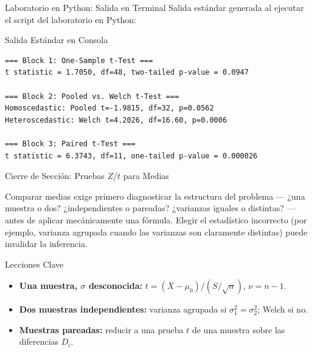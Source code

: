 \documentclass[10pt, aspectratio=169]{beamer}
\begin{document}
\begin{frame}[fragile]{Laboratorio en Python: Salida en Terminal}
  \scriptsize
  Salida estándar generada al ejecutar el script del laboratorio en Python:
  \vspace{0.02cm}
  \begin{block}{Salida Estándar en Consola}
    \fontsize{4pt}{5pt}\selectfont
    \begin{verbatim}
=== Block 1: One-Sample t-Test ===
t statistic = 1.7050, df=48, two-tailed p-value = 0.0947

=== Block 2: Pooled vs. Welch t-Test ===
Homoscedastic: Pooled t=-1.9815, df=32, p=0.0562
Heteroscedastic: Welch t=4.2026, df=16.60, p=0.0006

=== Block 3: Paired t-Test ===
t statistic = 6.3743, df=11, one-tailed p-value = 0.000026
    \end{verbatim}
  \end{block}
\end{frame}

\begin{frame}{Cierre de Sección: Pruebas $Z$/$t$ para Medias}
  \begin{reflexion}
    Comparar medias exige primero diagnosticar la estructura del problema --- ¿una muestra o dos? ¿independientes o pareadas? ¿varianzas iguales o distintas? --- antes de aplicar mecánicamente una fórmula. Elegir el estadístico incorrecto (por ejemplo, varianza agrupada cuando las varianzas son claramente distintas) puede invalidar la inferencia.
  \end{reflexion}

  \vspace{0.2cm}
  \pause
  \begin{block}{Lecciones Clave}
    \begin{itemize}\itemsep=0.08cm
      \item \textbf{Una muestra, $\sigma$ desconocida:} $t=(\bar X-\mu_0)/(S/\sqrt n)$, $\nu=n-1$.
      \item \textbf{Dos muestras independientes:} varianza agrupada si $\sigma_1^2=\sigma_2^2$; Welch si no.
      \item \textbf{Muestras pareadas:} reducir a una prueba $t$ de una muestra sobre las diferencias $D_i$.
    \end{itemize}
  \end{block}
\end{frame}
\end{document}
